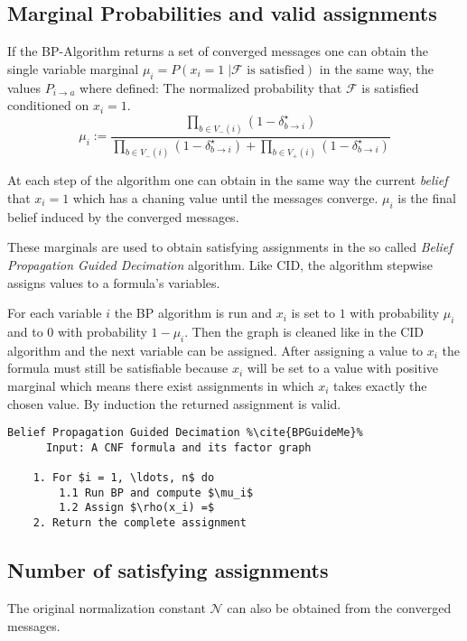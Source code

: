 \subsection{Marginal Probabilities and valid assignments}

If the BP-Algorithm returns a set of converged messages one can obtain the single variable marginal $\mu_i = P(x_i = 1 \; | \mathcal{F} \text{ is satisfied})$ in the same way, the values $P_{i \rightarrow a}$ where defined: The normalized probability that $\mathcal{F}$ is satisfied conditioned on $x_i = 1$.
$$ \mu_i := \frac{\prod_{b \in V_-(i)} (1 - \delta^\star_{b \rightarrow i})}{\prod_{b \in V_-(i)} (1 - \delta^\star_{b \rightarrow i}) + \prod_{b \in V_+(i)} (1 - \delta^\star_{b \rightarrow i})}$$

At each step of the algorithm one can obtain in the same way the current \emph{belief} that $x_i = 1$ which has a chaning value until the messages converge. $\mu_i$ is the final belief induced by the converged messages. \newline

These marginals are used to obtain satisfying assignments in the so called \emph{Belief Propagation Guided Decimation} algorithm. Like CID, the algorithm stepwise assigns  values to a formula's variables.

For each variable $i$ the BP algorithm is run and $x_i$ is set to $1$ with probability $\mu_i$ and to $0$ with probability $1 - \mu_i$. Then the graph is cleaned like in the CID algorithm and the next variable can be assigned. After assigning a value to $x_i$ the formula must still be satisfiable because $x_i$ will be set to a value with positive marginal which means there exist assignments in which $x_i$ takes exactly the chosen value. By induction the returned assignment is valid.

\begin{lstlisting}[mathescape=true, frame = single, escapechar=\%]
	Belief Propagation Guided Decimation %\cite{BPGuideMe}%
	  Input: A CNF formula and its factor graph
	  
	1. For $i = 1, \ldots, n$ do
		1.1 Run BP and compute $\mu_i$
		1.2 Assign $\rho(x_i) =$
	2. Return the complete assignment
\end{lstlisting}



\subsection{Number of satisfying assignments}

The original normalization constant $\mathcal{N}$ can also be obtained from the converged messages. 